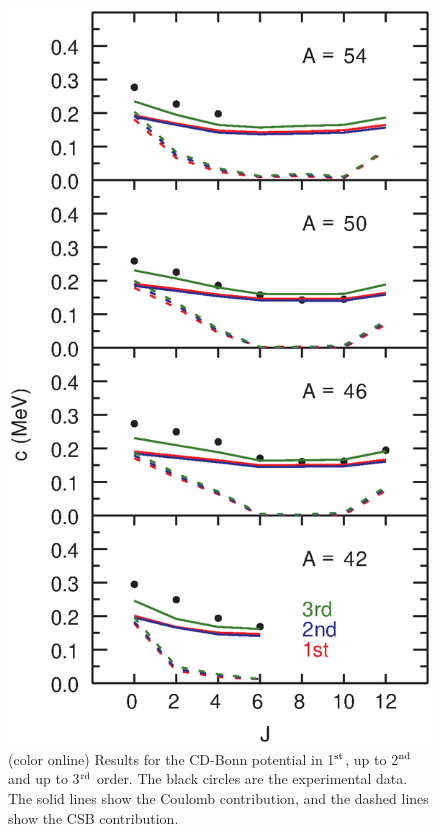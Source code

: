 \documentclass[10pt,showpacs,preprintnumbers,footinbib,amsmath,amssymb,aps,prl,twocolumn,groupedaddress,superscriptaddress,showkeys]{revtex4-1}
\begin{document}
\begin{figure}
\includegraphics[scale=0.35]{ccd.eps}
\caption{(color online) Results for the CD-Bonn potential
in 1$^{\rm st}$, up to 2$^{\rm nd}$ and up to 3$^{\rm rd}$ order.
The black circles
are the experimental data. The solid lines show the Coulomb
contribution, and the dashed lines show the CSB contribution.}
\end{figure}
\end{document}
